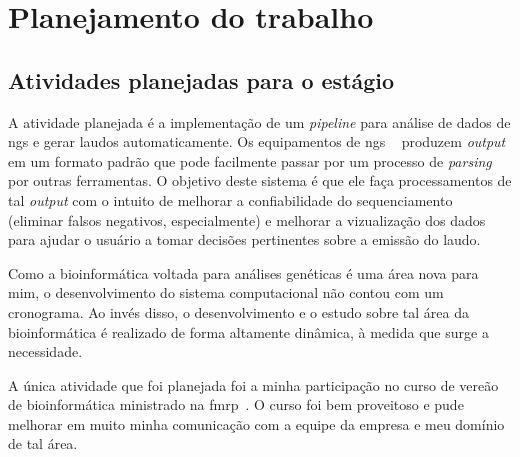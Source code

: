 \chapter{Planejamento do trabalho}
\label{chap:atividadesPlanejadas}

\section{Atividades planejadas para o estágio}

A atividade planejada é a implementação de um \textit{pipeline} para análise de dados de \gls{ngs} e gerar laudos automaticamente. Os equipamentos de \gls{ngs}
~\cite{NGEN} produzem \textit{output} em um formato padrão que pode facilmente passar por um processo de \textit{parsing} 
por outras ferramentas. O objetivo deste sistema é que ele faça processamentos de tal \textit{output} com o intuito de melhorar a 
confiabilidade do sequenciamento (eliminar falsos negativos, especialmente) 
e melhorar a vizualização dos dados para ajudar o usuário a tomar decisões pertinentes sobre a emissão do laudo.

Como a bioinformática voltada para análises genéticas é uma área nova para mim, o desenvolvimento do sistema computacional não contou com um cronograma.
Ao invés disso, o desenvolvimento e o estudo sobre tal área da bioinformática é realizado de forma altamente dinâmica, à medida que surge a necessidade.

A única atividade que foi planejada foi a minha participação no curso de vereão de bioinformática ministrado na \gls{fmrp}~\cite{BIOC}. O curso foi bem proveitoso
e pude melhorar em muito minha comunicação com a equipe da empresa e meu domínio de tal área.




